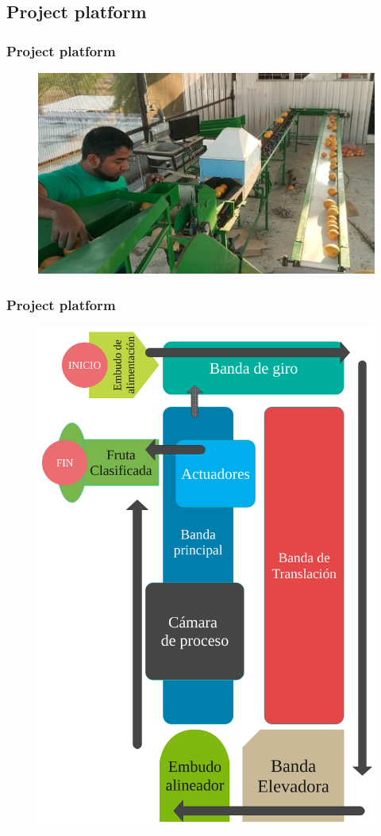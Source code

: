 \documentclass[
serif,
compress,
xcolor=table,
dvipsnames,
]{beamer}
\begin{document}
\subsection{Project platform}
\begin{frame}
\frametitle{Project platform}
\begin{figure}[h]
    \centering
    \includegraphics[width=\linewidth]{maq.jpeg}
    \label{trans}
\end{figure}
\end{frame}


\begin{frame}
	\frametitle{Project platform}
	\begin{figure}[h]
		\centering
		\includegraphics[width=.5\linewidth]{F/diagramamaquina}
		\label{trans}
	\end{figure}
\end{frame}
\end{document}
